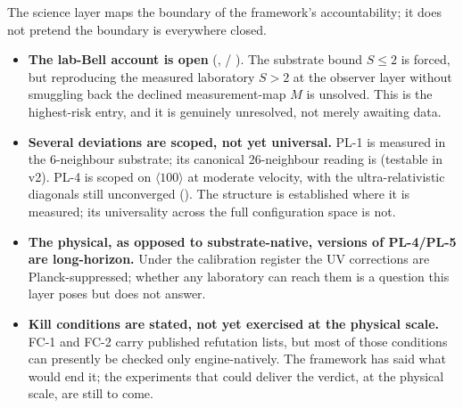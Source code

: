 The science layer maps the boundary of the framework's accountability; it does
not pretend the boundary is everywhere closed.

\begin{itemize}[leftmargin=1.4em,itemsep=3pt,topsep=2pt]
  \item \textbf{The lab-Bell account is open} (,  /
  ). The substrate bound $S\le2$ is forced, but reproducing the
  measured laboratory $S>2$ at the observer layer without smuggling back the
  declined measurement-map $M$ is unsolved. This is the highest-risk entry, and
  it is genuinely unresolved, not merely awaiting data.
  \item \textbf{Several deviations are scoped, not yet universal.} PL-1 is
  measured in the 6-neighbour substrate; its canonical 26-neighbour reading is
   (testable in v2). PL-4 is scoped  on $\langle100\rangle$
  at moderate velocity, with the ultra-relativistic diagonals still unconverged
  (). The structure is established where it is measured; its
  universality across the full configuration space is not.
  \item \textbf{The physical, as opposed to substrate-native, versions of
  PL-4/PL-5 are long-horizon.} Under the calibration register the UV
  corrections are Planck-suppressed; whether any laboratory can reach them is a
  question this layer poses but does not answer.
  \item \textbf{Kill conditions are stated, not yet exercised at the physical
  scale.} FC-1 and FC-2 carry published refutation lists, but most of those
  conditions can presently be checked only engine-natively. The framework has
  said what would end it; the experiments that could deliver the verdict, at the
  physical scale, are still to come.
\end{itemize}
